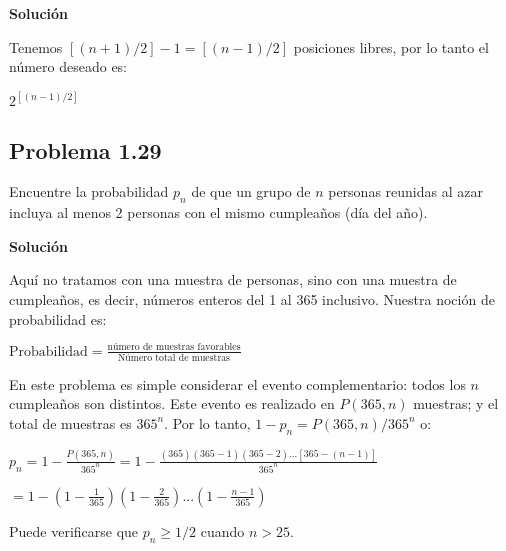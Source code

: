 \documentclass[12pt]{article}
\begin{document}
\textbf{Solución}

Tenemos $[(n + 1)/2] - 1 = [(n - 1)/2]$ posiciones libres, por lo tanto el número
deseado es:

$2^{[(n-1)/2]}$


\subsection*{Problema 1.29}
Encuentre la probabilidad $p_n$ de que un grupo de $n$ personas reunidas al azar
incluya al menos 2 personas con el mismo cumpleaños (día del año).

\textbf{Solución}

Aquí no tratamos con una muestra de personas, sino con una muestra de
cumpleaños, es decir, números enteros del 1 al 365 inclusivo. Nuestra noción de
probabilidad es:

$\text{Probabilidad} = \frac{\text{número de muestras favorables}}{\text{Número total de muestras}}$

En este problema es simple considerar el evento complementario: todos los $n$
cumpleaños son distintos. Este evento es realizado en $P(365,n)$ muestras; y el
total de muestras es $365^n$. Por lo tanto, $1-p_n = P(365,n)/365^n$ o:

$p_n = 1 - \frac{P(365,n)}{365^n} = 1 -
\frac{(365)(365-1)(365-2)...[365-(n-1)]}{365^n} $

$= 1-(1 - \frac{1}{365})(1 - \frac{2}{365})...(1 - \frac{n-1}{365})$

Puede verificarse que $p_n \geq 1/2 $ cuando $n>25$.
\end{document}
